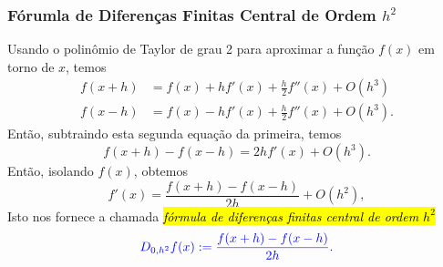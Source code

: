\subsubsection{Fórumla de Diferenças Finitas Central de Ordem $h^2$}

Usando o polinômio de Taylor de grau 2 para aproximar a função $f(x)$ em torno de $x$, temos
\begin{align}
  f(x+h) &= f(x) + hf'(x) + \frac{h}{2}f''(x) + O(h^3)\\
  f(x-h) &= f(x) - hf'(x) + \frac{h}{2}f''(x) + O(h^3).
\end{align}
Então, subtraindo esta segunda equação da primeira, temos
\begin{equation}
  f(x+h)-f(x-h) = 2hf'(x) + O(h^3).
\end{equation}
Então, isolando $f(x)$, obtemos
\begin{equation}
  f'(x) = \frac{f(x+h)-f(x-h)}{2h} + O(h^2),
\end{equation}
Isto nos fornece a chamada \hl{\emph{fórmula de diferenças finitas central de ordem $h^2$}}
\begin{equation}\label{cap_deriv_sec_df:eq:dfc_h2}\color{blue}D_{0,h^2}f(x) := \frac{f(x+h)-f(x-h)}{2h}.
\end{equation}

